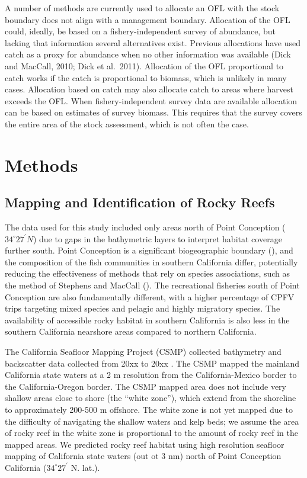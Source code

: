 \documentclass[
  12pt,
  authoryear,
  preprint,
  3p]{elsarticle}
\begin{document}
A number of methods are currently used to allocate an OFL with the stock
boundary does not align with a management boundary. Allocation of the
OFL could, ideally, be based on a fishery-independent survey of
abundance, but lacking that information several alternatives exist.
Previous allocations have used catch as a proxy for abundance when no
other information was available (Dick and MacCall, 2010; Dick et
al.~2011). Allocation of the OFL proportional to catch works if the
catch is proportional to biomass, which is unlikely in many cases.
Allocation based on catch may also allocate catch to areas where harvest
exceeds the OFL. When fishery-independent survey data are available
allocation can be based on estimates of survey biomass. This requires
that the survey covers the entire area of the stock assessment, which is
not often the case.

\hypertarget{methods}{%
\section{Methods}\label{methods}}

\hypertarget{mapping-and-identification-of-rocky-reefs}{%
\subsection{Mapping and Identification of Rocky
Reefs}\label{mapping-and-identification-of-rocky-reefs}}

The data used for this study included only areas north of Point
Conception (\(34^\circ 27^\prime N\)) due to gaps in the bathymetric
layers to interpret habitat coverage further south. Point Conception is
a significant biogeographic boundary (\citet{Valentine:1966:NAM}), and
the composition of the fish communities in southern California differ,
potentially reducing the effectiveness of methods that rely on species
associations, such as the method of Stephens and MacCall
(\citet{Stephens:2004:MAS}). The recreational fisheries south of Point
Conception are also fundamentally different, with a higher percentage of
CPFV trips targeting mixed species and pelagic and highly migratory
species. The availability of accessible rocky habitat in southern
California is also less in the southern California nearshore areas
compared to northern California.

The California Seafloor Mapping Project (CSMP) collected bathymetry and
backscatter data collected from 20xx to 20xx
\citep{Golden:2013:CSW, CSUMB:2014:CSM}. The CSMP mapped the mainland
California state waters at a 2 m resolution from the California-Mexico
border to the California-Oregon border. The CSMP mapped area does not
include very shallow areas close to shore (the ``white zone''), which
extend from the shoreline to approximately 200-500 m offshore. The white
zone is not yet mapped due to the difficulty of navigating the shallow
waters and kelp beds; we assume the area of rocky reef in the white zone
is proportional to the amount of rocky reef in the mapped areas. We
predicted rocky reef habitat using high resolution seafloor mapping of
California state waters (out ot 3 nm) north of Point Conception
California (\(34^\circ 27^\prime\) N. lat.).
\end{document}
